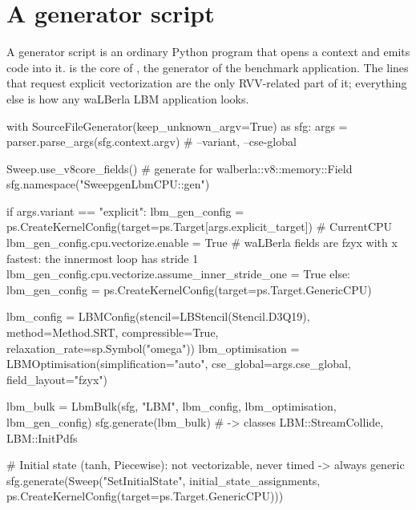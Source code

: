\section{A generator script}\label{r02:sec:sweepgen-script}

A generator script is an ordinary Python program that opens a
 context and emits code into it.
 is the core of , the generator of the
benchmark application. The lines that request explicit vectorization are the only
RVV-related part of it; everything else is how any waLBerla LBM application looks.

\begin{pycode}[nolol=false,caption={[Generator script of the benchmark]Generator script of the benchmark (\texttt{apps/benchmarks/SweepgenLbmCPU/SweepgenLbmCPU.py}, abridged).},label=r02:lst:genscript]
with SourceFileGenerator(keep_unknown_argv=True) as sfg:
    args = parser.parse_args(sfg.context.argv)      # --variant, --cse-global

    Sweep.use_v8core_fields()                       # generate for walberla::v8::memory::Field
    sfg.namespace("SweepgenLbmCPU::gen")

    if args.variant == "explicit":
        lbm_gen_config = ps.CreateKernelConfig(target=ps.Target[args.explicit_target])  # CurrentCPU
        lbm_gen_config.cpu.vectorize.enable = True
        #   waLBerla fields are fzyx with x fastest: the innermost loop has stride 1
        lbm_gen_config.cpu.vectorize.assume_inner_stride_one = True
    else:
        lbm_gen_config = ps.CreateKernelConfig(target=ps.Target.GenericCPU)

    lbm_config = LBMConfig(stencil=LBStencil(Stencil.D3Q19), method=Method.SRT,
                           compressible=True, relaxation_rate=sp.Symbol("omega"))
    lbm_optimisation = LBMOptimisation(simplification="auto", cse_global=args.cse_global,
                                       field_layout="fzyx")

    lbm_bulk = LbmBulk(sfg, "LBM", lbm_config, lbm_optimisation, lbm_gen_config)
    sfg.generate(lbm_bulk)                          # -> classes LBM::StreamCollide, LBM::InitPdfs

    #   Initial state (tanh, Piecewise): not vectorizable, never timed -> always generic
    sfg.generate(Sweep("SetInitialState", initial_state_assignments,
                       ps.CreateKernelConfig(target=ps.Target.GenericCPU)))
\end{pycode}

